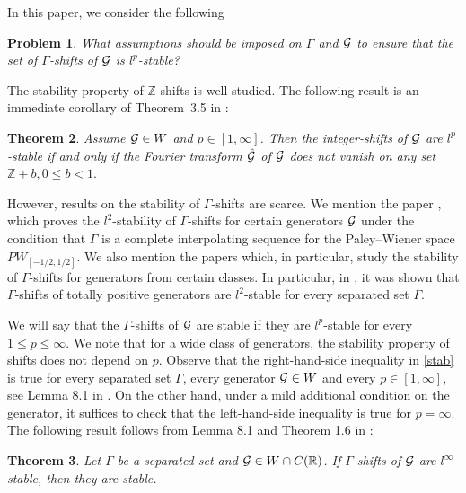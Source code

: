 \documentclass[12pt]{amsart}
\numberwithin{equation}{section}
\newtheorem{theorem}{Theorem}[section]
\newtheorem{problem}[theorem]{Problem}\newtheorem{example}[theorem]{Example}
\newcommand{\R}{{\mathbb R}} \newcommand{\Q}{{\mathbb Q}} \newcommand{\Z}{{\mathbb Z}} \newcommand{\N}{{\mathbb N}}
\begin{document}
 In this paper, we consider the following

\begin{problem}  What assumptions should be imposed on  $\Gamma$ and  $\mathcal{G}$ to ensure that the set of $\Gamma$-shifts of $\mathcal{G}$ is {\it $l^p$-stable}?
\end{problem}





The stability property of $\Z$-shifts is well-studied. 
The following result is an immediate corollary of Theorem~3.5  in  \cite{Jia1991}:

\begin{theorem}\label{integershifs}
    Assume $\mathcal{G}\in W$ and $p\in[1,\infty]$. Then the integer-shifts of $\mathcal{G}$ are $l^p$-stable if and only if the Fourier transform $\hat{\mathcal{G}}$ of $\mathcal{G}$ does not vanish on any set $\Z+b, 0\leq b<1. $
   \end{theorem}


However,   results on the stability of $\Gamma$-shifts are scarce.   We mention the paper \cite{MR3762092}, which proves the $l^2$-stability of   $\Gamma$-shifts for certain generators $\mathcal{G}$ under the condition that $\Gamma$ is a complete interpolating sequence for the Paley--Wiener space  $PW_{[-1/2,1/2]}$.
We also mention the papers \cite{MR3053565,uz}  which, in particular, study the stability of $\Gamma$-shifts for generators from certain classes. In particular, in \cite{MR3053565}, it was shown that $\Gamma$-shifts of totally positive generators are $l^2$-stable for every separated set $\Gamma.$


  We will say that the $\Gamma$-shifts of $\mathcal{G}$ are stable if they are $l^p$-stable for every $1\le p\le\infty.$ We note that for a wide class of generators, the stability property of shifts does not depend on $p$.
Observe that the right-hand-side inequality in \eqref{stab} is true for every separated set $\Gamma$, every generator $\mathcal{G}\in W$ and every $p\in[1,\infty]$, see Lemma 8.1 in \cite{uz}. On the other hand, under a mild additional condition on the generator, it suffices to check that the left-hand-side inequality is true for   $p=\infty$. 
The following result follows from Lemma 8.1 and Theorem 1.6 in \cite{uz}:

\begin{theorem}\label{t0}
    Let $\Gamma$ be a separated set and $\Ff\in W\cap C(\R)$. If  $\Gamma$-shifts of $\mathcal{G}$ are $l^\infty$-stable, then they are stable. 
\end{theorem}
\end{document}
